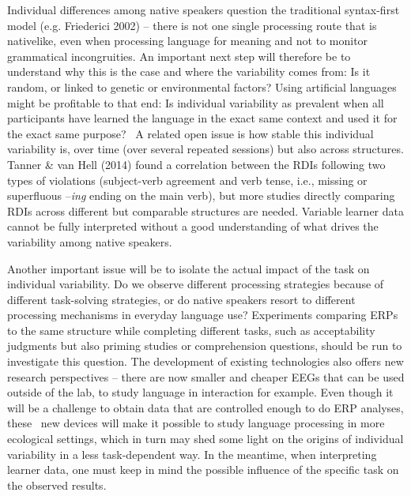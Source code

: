 \documentclass[11pt]{article}
\newenvironment{styleStandard}{\renewcommand\baselinestretch{1.0}\setlength\leftskip{0cm}\setlength\rightskip{0cm plus 1fil}\setlength\parindent{0cm}\setlength\parfillskip{0pt plus 1fil}\setlength\parskip{0in plus 1pt}\writerlistparindent\writerlistleftskip\leavevmode\normalfont\normalsize\writerlistlabel\ignorespaces}{\unskip\vspace{0.111in plus 0.0111in}\par}
\newcommand\writerlistleftskip{}
\newcommand\writerlistparindent{}
\newcommand\writerlistlabel{}
\begin{document}
\begin{styleStandard}
Individual differences among native speakers question the traditional syntax-first model (e.g. Friederici 2002) – there is not one single processing route that is nativelike, even when processing language for meaning and not to monitor grammatical incongruities. An important next step will therefore be to understand why this is the case and where the variability comes from: Is it random, or linked to genetic or environmental factors? Using artificial languages might be profitable to that end: Is individual variability as prevalent when all participants have learned the language in the exact same context and used it for the exact same purpose? \ A related open issue is how stable this individual variability is, over time (over several repeated sessions) but also across structures. Tanner \& van Hell (2014) found a correlation between the RDIs following two types of violations (subject-verb agreement and verb tense, i.e., missing or superfluous –\textit{ing} ending on the main verb), but more studies directly comparing RDIs across different but comparable structures are needed. Variable learner data cannot be fully interpreted without a good understanding of what drives the variability among native speakers.
\end{styleStandard}

\begin{styleStandard}
Another important issue will be to isolate the actual impact of the task on individual variability. Do we observe different processing strategies because of different task-solving strategies, or do native speakers resort to different processing mechanisms in everyday language use? Experiments comparing ERPs to the same structure while completing different tasks, such as acceptability judgments but also priming studies or comprehension questions, should be run to investigate this question. The development of existing technologies also offers new research perspectives – there are now smaller and cheaper EEGs that can be used outside of the lab, to study language in interaction for example. Even though it will be a challenge to obtain data that are controlled enough to do ERP analyses, these \ new devices will make it possible to study language processing in more ecological settings, which in turn may shed some light on the origins of individual variability in a less task-dependent way. In the meantime, when interpreting learner data, one must keep in mind the possible influence of the specific task on the observed results. 
\end{styleStandard}
\end{document}
